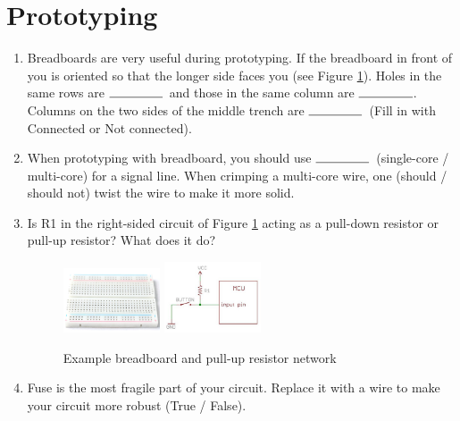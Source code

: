 \documentclass{article}
\newcommand{\ans}{$\rule{1.5cm}{0.15mm}$}
\begin{document}
\section{Prototyping}
\begin{enumerate}
	\item Breadboards are very useful during prototyping. If the breadboard in front of you is oriented so that the longer side faces you (see Figure \ref{fig:bread}). Holes in the same rows are \ans\ and those in the same column are \ans. Columns on the two sides of the middle trench are \ans\ (Fill in with Connected or Not connected). 
	\item When prototyping with breadboard, you should use \ans\ (single-core / multi-core) for a signal line. When crimping a multi-core wire, one (should / should not) twist the wire to make it more solid. 
	\item Is R1 in the right-sided circuit of Figure \ref{fig:bread} acting as a pull-down resistor or pull-up resistor? What does it do?
	\begin{figure}[h]
		\center
		\includegraphics[width=0.27\textwidth, keepaspectratio]{bread}
		\includegraphics[width=0.27\textwidth, keepaspectratio]{pull}
		\caption{Example breadboard and pull-up resistor network}
		\label{fig:bread}
	\end{figure}
	\item Fuse is the most fragile part of your circuit. Replace it with a wire to make your circuit more robust (True / False).
\end{enumerate}
\end{document}
